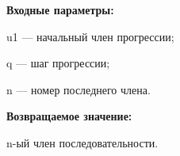 \textbf{Входные параметры:}  
 
u1 --- начальный член прогрессии;
 
q --- шаг  прогрессии;
 
n --- номер последнего члена.

\textbf{Возвращаемое значение:}
 
n-ый член последовательности.